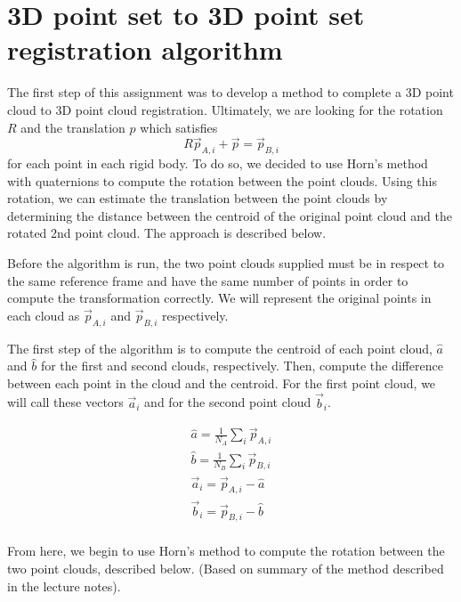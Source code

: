 \documentclass[letterpaper, 11pt]{report}
\begin{document}
\section{3D point set to 3D point set registration algorithm}
The first step of this assignment was to develop a method to complete a 3D point cloud to 3D point cloud registration. Ultimately, we are looking for the rotation $R$ and the translation $p$ which satisfies $$R\vec p_{A,i} + \vec p = \vec p_{B,i}$$ for each point in each rigid body. To do so, we decided to use Horn's method with quaternions to compute the rotation between the point clouds. Using this rotation, we can estimate the translation between the point clouds by determining the distance between the centroid of the original point cloud and the rotated 2nd point cloud. The approach is described below.

Before the algorithm is run, the two point clouds supplied must be in respect to the same reference frame and have the same number of points in order to compute the transformation correctly. We will represent the original points in each cloud as $\vec p_{A,i}$ and $\vec p_{B,i}$ respectively.

The first step of the algorithm is to compute the centroid of each point cloud, $\hat{a}$ and $\hat{b}$ for the first and second clouds, respectively. Then, compute the difference between each point in the cloud and the centroid. For the first point cloud, we will call these vectors $\vec a_i$ and for the second point cloud $\vec b_i$.

\begin{align*}
	\hat{a} = \frac{1}{N_A}\sum_i{\vec p_{A,i}} \\
    \hat{b} = \frac{1}{N_B}\sum_i{\vec p_{B,i}} \\
    \vec a_i = \vec p_{A,i} - \hat{a} \\
    \vec b_i = \vec p_{B,i} - \hat{b} \\
\end{align*}

From here, we begin to use Horn's method to compute the rotation between the two point clouds, described below. (Based on summary of the method described in the lecture notes).
\end{document}
